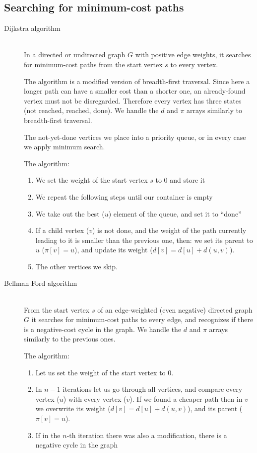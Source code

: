 \documentclass[margin=0px]{article}
\begin{document}
\subsection{Searching for minimum-cost paths}
\begin{description}
    \item[Dijkstra algorithm] \hfill \\
        In a directed or undirected graph $G$ with positive edge weights, it searches for minimum-cost paths from the start vertex $s$ to every vertex.

        The algorithm is a modified version of breadth-first traversal. Since here a longer path can have a smaller cost than a shorter one, an already-found vertex must not be disregarded. Therefore every vertex has three states (not reached, reached, done). We handle the $d$ and $\pi$ arrays similarly to breadth-first traversal.

        The not-yet-done vertices we place into a priority queue, or in every case we apply minimum search.

        The algorithm:
        \begin{enumerate}
            \item We set the weight of the start vertex $s$ to 0 and store it
            \item We repeat the following steps until our container is empty
            \item We take out the best ($u$) element of the queue, and set it to ``done''
            \item If a child vertex ($v$) is not done, and the weight of the path currently leading to it is smaller than the previous one, then: we set its parent to $u$ ($\pi[v] = u$), and update its weight ($d[v] = d[u]+d(u,v)$).
            \item The other vertices we skip.
        \end{enumerate}

    \item[Bellman-Ford algorithm] \hfill \\
        From the start vertex $s$ of an edge-weighted (even negative) directed graph $G$ it searches for minimum-cost paths to every edge, and recognizes if there is a negative-cost cycle in the graph. We handle the $d$ and $\pi$ arrays similarly to the previous ones.

        The algorithm:
        \begin{enumerate}
            \item Let us set the weight of the start vertex to 0.
            \item In $n-1$ iterations let us go through all vertices, and compare every vertex ($u$) with every vertex ($v$). If we found a cheaper path then in $v$ we overwrite its weight ($d[v] = d[u]+d(u,v)$), and its parent ($\pi[v] = u$).
            \item If in the $n$-th iteration there was also a modification, there is a negative cycle in the graph
        \end{enumerate}
\end{description}
\end{document}

